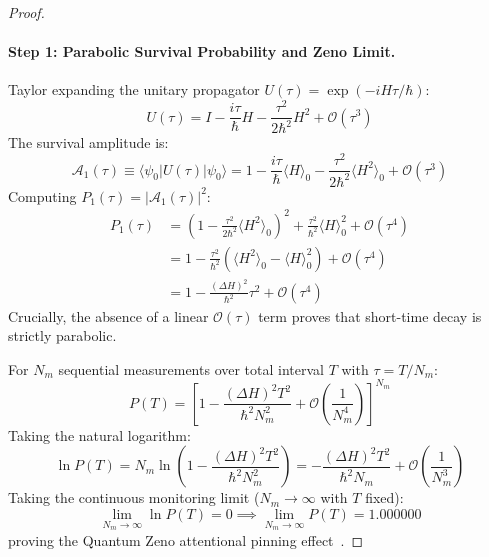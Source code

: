 \documentclass[10pt,twocolumn,3p]{article}
\begin{document}
\begin{proof}
\paragraph{Step 1: Parabolic Survival Probability and Zeno Limit.}
Taylor expanding the unitary propagator $U(\tau) = \exp(-i H \tau / \hbar)$:
\begin{equation}
    U(\tau) = I - \frac{i \tau}{\hbar} H - \frac{\tau^2}{2\hbar^2} H^2 + \mathcal{O}(\tau^3)
\end{equation}
The survival amplitude is:
\begin{equation}
    \mathcal{A}_1(\tau) \equiv \langle \psi_0 | U(\tau) | \psi_0 \rangle = 1 - \frac{i \tau}{\hbar} \langle H \rangle_0 - \frac{\tau^2}{2\hbar^2} \langle H^2 \rangle_0 + \mathcal{O}(\tau^3)
\end{equation}
Computing $P_1(\tau) = |\mathcal{A}_1(\tau)|^2$:
\begin{align}
    P_1(\tau) &= \left(1 - \frac{\tau^2}{2\hbar^2} \langle H^2 \rangle_0\right)^2 + \frac{\tau^2}{\hbar^2} \langle H \rangle_0^2 + \mathcal{O}(\tau^4) \nonumber \\
    &= 1 - \frac{\tau^2}{\hbar^2} \left( \langle H^2 \rangle_0 - \langle H \rangle_0^2 \right) + \mathcal{O}(\tau^4) \nonumber \\
    &= 1 - \frac{(\Delta H)^2}{\hbar^2} \tau^2 + \mathcal{O}(\tau^4)
\end{align}
Crucially, the absence of a linear $\mathcal{O}(\tau)$ term proves that short-time decay is strictly parabolic.

For $N_m$ sequential measurements over total interval $T$ with $\tau = T/N_m$:
\begin{equation}
    P(T) = \left[ 1 - \frac{(\Delta H)^2 T^2}{\hbar^2 N_m^2} + \mathcal{O}\left(\frac{1}{N_m^4}\right) \right]^{N_m}
\end{equation}
Taking the natural logarithm:
\begin{equation}
    \ln P(T) = N_m \ln\left(1 - \frac{(\Delta H)^2 T^2}{\hbar^2 N_m^2}\right) = -\frac{(\Delta H)^2 T^2}{\hbar^2 N_m} + \mathcal{O}\left(\frac{1}{N_m^3}\right)
\end{equation}
Taking the continuous monitoring limit ($N_m \to \infty$ with $T$ fixed):
\begin{equation}
    \lim_{N_m \to \infty} \ln P(T) = 0 \implies \boxed{\lim_{N_m \to \infty} P(T) = 1.000000}
\end{equation}
proving the Quantum Zeno attentional pinning effect~\cite{misra1977}.


\end{proof}
\end{document}

